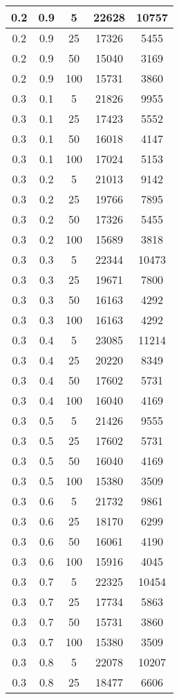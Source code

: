 \begin{appendices}
\begin{longtable}[c]{|c|c|c|c|c|}
	\hline
	0.2& 0.9& 5& 22628&  10757\\
	\hline
	0.2& 0.9& 25& 17326&  5455\\
	\hline
	0.2& 0.9& 50& 15040&  3169\\
	\hline
	0.2& 0.9& 100& 15731&  3860\\
	\hline
	0.3& 0.1& 5& 21826&  9955\\
	\hline
	0.3& 0.1& 25& 17423&  5552\\
	\hline
	0.3& 0.1& 50& 16018&  4147\\
	\hline
	0.3& 0.1& 100& 17024&  5153\\
	\hline
	0.3& 0.2& 5& 21013&  9142\\
	\hline
	0.3& 0.2& 25& 19766&  7895\\
	\hline
	0.3& 0.2& 50& 17326&  5455\\
	\hline
	0.3& 0.2& 100& 15689&  3818\\
	\hline
	0.3& 0.3& 5& 22344&  10473\\
	\hline
	0.3& 0.3& 25& 19671&  7800\\
	\hline
	0.3& 0.3& 50& 16163&  4292\\
	\hline
	0.3& 0.3& 100& 16163&  4292\\
	\hline
	0.3& 0.4& 5& 23085&  11214\\
	\hline
	0.3& 0.4& 25& 20220&  8349\\
	\hline
	0.3& 0.4& 50& 17602&  5731\\
	\hline
	0.3& 0.4& 100& 16040&  4169\\
	\hline
	0.3& 0.5& 5& 21426&  9555\\
	\hline
	0.3& 0.5& 25& 17602&  5731\\
	\hline
	0.3& 0.5& 50& 16040&  4169\\
	\hline
	0.3& 0.5& 100& 15380&  3509\\
	\hline
	0.3& 0.6& 5& 21732&  9861\\
	\hline
	0.3& 0.6& 25& 18170&  6299\\
	\hline
	0.3& 0.6& 50& 16061&  4190\\
	\hline
	0.3& 0.6& 100& 15916&  4045\\
	\hline
	0.3& 0.7& 5& 22325&  10454\\
	\hline
	0.3& 0.7& 25& 17734&  5863\\
	\hline
	0.3& 0.7& 50& 15731&  3860\\
	\hline
	0.3& 0.7& 100& 15380&  3509\\
	\hline
	0.3& 0.8& 5& 22078&  10207\\
	\hline
	0.3& 0.8& 25& 18477&  6606\\

\end{longtable}
\end{appendices}

